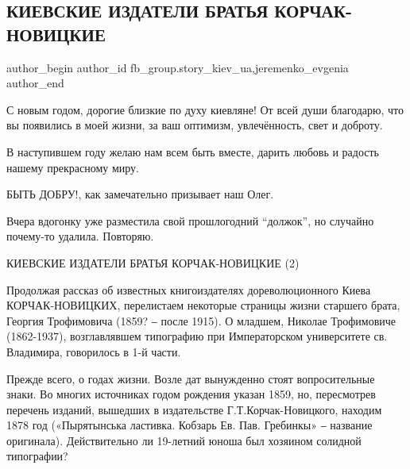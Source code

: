  
 
 
 
 
 
\subsection{КИЕВСКИЕ ИЗДАТЕЛИ БРАТЬЯ КОРЧАК-НОВИЦКИЕ}
\label{sec:01_01_2022.fb.fb_group.story_kiev_ua.1.izdateli_bratja_korchak_novickie}
 
\ifcmt
 author_begin
   author_id fb_group.story_kiev_ua,jeremenko_evgenia
 author_end
\fi

С новым годом, дорогие близкие по духу киевляне! От всей души благодарю, что вы
появились в моей жизни, за ваш оптимизм, увлечённость, свет и доброту. 

В наступившем году желаю нам всем быть вместе, дарить любовь и радость нашему
прекрасному миру. 

БЫТЬ ДОБРУ!, как замечательно призывает наш Олег. 

Вчера вдогонку уже разместила свой прошлогодний \enquote{должок}, но случайно почему-то
удалила. Повторяю.

КИЕВСКИЕ ИЗДАТЕЛИ БРАТЬЯ КОРЧАК-НОВИЦКИЕ (2)

Продолжая рассказ об известных книгоиздателях дореволюционного Киева
КОРЧАК-НОВИЦКИХ, перелистаем некоторые страницы жизни старшего брата, Георгия
Трофимовича (1859? ‒ после 1915). О младшем, Николае Трофимовиче (1862-1937),
возглавлявшем типографию при Императорском университете св. Владимира,
говорилось в 1-й части.


Прежде всего, о годах жизни. Возле дат вынужденно стоят вопросительные знаки.
Во многих источниках годом рождения указан 1859, но, пересмотрев перечень
изданий, вышедших в издательстве Г.Т.Корчак-Новицкого, находим 1878 год
(«Пырятынська ластивка. Кобзарь Ев. Пав. Гребинкы» ‒ название оригинала).
Действительно ли 19-летний юноша был хозяином солидной типографии? 


